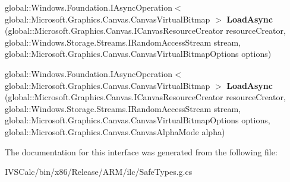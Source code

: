 \begin{DoxyCompactItemize}
global\+::\+Windows.\+Foundation.\+I\+Async\+Operation$<$ global\+::\+Microsoft.\+Graphics.\+Canvas.\+Canvas\+Virtual\+Bitmap $>$ {\bfseries Load\+Async} (global\+::\+Microsoft.\+Graphics.\+Canvas.\+I\+Canvas\+Resource\+Creator resource\+Creator, global\+::\+Windows.\+Storage.\+Streams.\+I\+Random\+Access\+Stream stream, global\+::\+Microsoft.\+Graphics.\+Canvas.\+Canvas\+Virtual\+Bitmap\+Options options)
\item 
\mbox{\label{interface_microsoft_1_1_graphics_1_1_canvas_1_1_i_canvas_virtual_bitmap_statics_a60b2049c357c42be3e7dbccef1e43260}} 
global\+::\+Windows.\+Foundation.\+I\+Async\+Operation$<$ global\+::\+Microsoft.\+Graphics.\+Canvas.\+Canvas\+Virtual\+Bitmap $>$ {\bfseries Load\+Async} (global\+::\+Microsoft.\+Graphics.\+Canvas.\+I\+Canvas\+Resource\+Creator resource\+Creator, global\+::\+Windows.\+Storage.\+Streams.\+I\+Random\+Access\+Stream stream, global\+::\+Microsoft.\+Graphics.\+Canvas.\+Canvas\+Virtual\+Bitmap\+Options options, global\+::\+Microsoft.\+Graphics.\+Canvas.\+Canvas\+Alpha\+Mode alpha)
\end{DoxyCompactItemize}


The documentation for this interface was generated from the following file\+:\begin{DoxyCompactItemize}
\item 
I\+V\+S\+Calc/bin/x86/\+Release/\+A\+R\+M/ilc/Safe\+Types.\+g.\+cs\end{DoxyCompactItemize}
